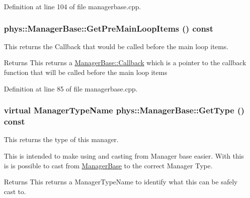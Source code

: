 Definition at line 104 of file managerbase.cpp.

\hypertarget{classphys_1_1ManagerBase_a02a92b0d5df8b8b877822bdf57ec8ffc}{
\subsubsection[{GetPreMainLoopItems}]{ phys::ManagerBase::GetPreMainLoopItems () const}}
\label{d2/de3/classphys_1_1ManagerBase_a02a92b0d5df8b8b877822bdf57ec8ffc}


This returns the Callback that would be called before the main loop items. 

\begin{DoxyReturn}{Returns}
This returns a \hyperlink{classphys_1_1ManagerBase_a753f5f0127131529767beab2502f480b}{ManagerBase::Callback} which is a pointer to the callback function that will be called before the main loop items 
\end{DoxyReturn}


Definition at line 85 of file managerbase.cpp.

\hypertarget{classphys_1_1ManagerBase_aff400b6599db635e24796d8221e9a0e3}{
\subsubsection[{GetType}]{\setlength{\rightskip}{0pt plus 5cm}virtual {\bf ManagerTypeName} phys::ManagerBase::GetType () const}}
\label{d2/de3/classphys_1_1ManagerBase_aff400b6599db635e24796d8221e9a0e3}


This returns the type of this manager. 

This is intended to make using and casting from Manager base easier. With this is is possible to cast from \hyperlink{classphys_1_1ManagerBase}{ManagerBase} to the correct Manager Type. \begin{DoxyReturn}{Returns}
This returns a ManagerTypeName to identify what this can be safely cast to. 
\end{DoxyReturn}


